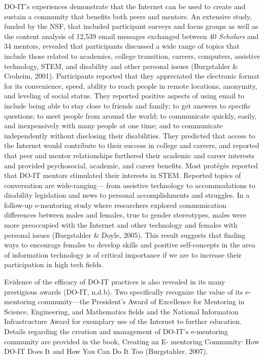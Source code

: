 \documentclass[11.5pt]{sig-alternate} %
\begin{document}
\begin{large}
DO-IT's experiences demonstrate that the Internet can be used to create and sustain a community that benefits both peers and mentors. An extensive study, funded by the NSF, that included participant surveys and focus groups as well as the content analysis of 12,539 email messages exchanged between 40 \textit{Scholars} and 34 mentors, revealed that participants discussed a wide range of topics that include those related to academics, college transition, careers, computers, assistive technology, STEM, and disability and other personal issues (Burgstahler \& Croheim, 2001). Participants reported that they appreciated the electronic format for its convenience, speed, ability to reach people in remote locations, anonymity, and leveling of social status. They reported positive aspects of using email to include being able to stay close to friends and family; to get answers to specific questions; to meet people from around the world; to communicate quickly, easily, and inexpensively with many people at one time; and to communicate independently without disclosing their disabilities. They predicted that access to the Internet would contribute to their success in college and careers, and reported that peer and mentor relationships furthered their academic and career interests and provided psychosocial, academic, and career benefits. Most protégés reported that DO-IT mentors stimulated their interests in STEM. Reported topics of conversation are wide-ranging— from assistive technology to accommodations to disability legislation and news to personal accomplishments and struggles. In a follow-up e-mentoring study where researchers explored communication differences between males and females, true to gender stereotypes, males were more preoccupied with the Internet and other technology and females with personal issues (Burgstahler \& Doyle, 2005). This result suggests that finding ways to encourage females to develop skills and positive self-concepts in the area of information technology is of critical importance if we are to increase their participation in high tech fields.

Evidence of the efficacy of DO-IT practices is also revealed in its many prestigious awards (DO-IT, n.d.b). Two specifically recognize the value of its e-mentoring community—the President's Award of Excellence for Mentoring in Science, Engineering, and Mathematics fields and the National Information Infrastructure Award for exemplary use of the Internet to further education. Details regarding the creation and management of DO-IT's e-mentoring community are provided in the book, Creating an E- mentoring Community: How DO-IT Does It and How You Can Do It Too (Burgstahler, 2007).


\end{large}
\end{document}
